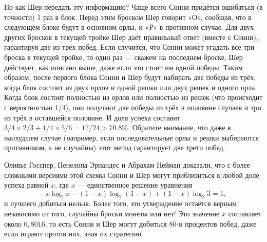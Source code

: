 Но как Шер передать эту информацию?
Чаще всего Сонни придётся ошибаться (в точности) 1 раз в блок.
Перед этим броском Шер говорит «О», сообщая, что в следующем блоке будут в основном орлы, и «Р» в противном случае.
Для двух других бросков в текущей тройке Шер даёт правильный ответ (вместе с Сонни), гарантируя две из трёх побед.
Если случится, что Сонни может угадать все три броска в текущей тройке,
то один раз --- скажем на последнем броске, Шер действует, как описано выше, даже если это стоит им одной победы.
Таким образом, после первого блока Сонни и Шер будут набирать две победы из трёх, когда блок состоит из двух орлов и одной решки или двух решек и одного орла.
Когда блок состоит полностью из орлов или полностью из решек (что происходит с вероятностью 1/4), они получают две победы из трёх в половине случаев и три из трёх в оставшейся половине.
И доля успеха составит $3/4 \times 2/3 + 1/4 \times 5/6 = 17/24 > 70.8\%$.
Обратите внимание, что даже в наихудшем случае (например, если последовательные орлы и решки выбираются противником, а не случайны) этот метод гарантирует две трети побед.

Оливье Госснер, Пенелопа Эрнандес и Абрахам Нейман \cite{32} доказали, что с более сложными версиями этой схемы Сонни и Шер могут приблизиться к любой доле успеха равной $x$, где $x$ --- единственное решение уравнения
\[-x \log_2 x - (1 - x) \log_2 (1 - x) + (1 - x) \log_2 3 = 1,\]
и лучшего добиться нельзя.
Более того, это утверждение остаётся верным независимо от того, случайны броски монеты или нет!
Это значение $x$ составляет около $0{,}8016$, то есть Сонни и Шер могут добиться  $80$-и процентов побед, даже если играют против них, зная их стратегию.

